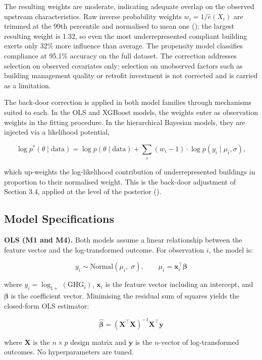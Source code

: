 The resulting weights are moderate, indicating adequate overlap on the observed upstream characteristics. Raw inverse probability weights $w_i = 1 / \hat{e}(X_i)$ are trimmed at the 99th percentile and normalised to mean one (); the largest resulting weight is 1.32, so even the most underrepresented compliant building exerts only 32\% more influence than average. The propensity model classifies compliance at 95.1\% accuracy on the full dataset. The correction addresses selection on observed covariates only; selection on unobserved factors such as building management quality or retrofit investment is not corrected and is carried as a limitation.

The back-door correction is applied in both model families through mechanisms suited to each. In the OLS and XGBoost models, the weights enter as observation weights in the fitting procedure. In the hierarchical Bayesian models, they are injected via a likelihood potential,

\[
\log p^*(\theta \mid \text{data}) = \log p(\theta \mid \text{data}) + \sum_i (w_i - 1) \cdot \log p(y_i \mid \mu_i, \sigma),
\]

which up-weights the log-likelihood contribution of underrepresented buildings in proportion to their normalised weight. This is the back-door adjustment of Section 3.4, applied at the level of the posterior ().

\subsection{Model Specifications}

\textbf{OLS (M1 and M4).} Both models assume a linear relationship between the feature vector and the log-transformed outcome. For observation $i$, the model is:

\[
y_i \sim \text{Normal}(\mu_i,\; \sigma), \qquad \mu_i = \mathbf{x}_i^\top \boldsymbol{\beta}
\]

where $y_i = \log_{1+}(\text{GHG}_i)$, $\mathbf{x}_i$ is the feature vector including an intercept, and $\boldsymbol{\beta}$ is the coefficient vector. Minimising the residual sum of squares yields the closed-form OLS estimator:

\[
\hat{\boldsymbol{\beta}} = (\mathbf{X}^\top \mathbf{X})^{-1} \mathbf{X}^\top \mathbf{y}
\]

where $\mathbf{X}$ is the $n \times p$ design matrix and $\mathbf{y}$ is the $n$-vector of log-transformed outcomes. No hyperparameters are tuned.

